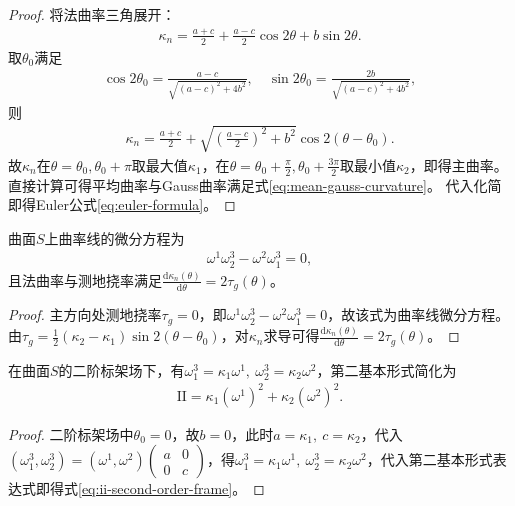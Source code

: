 \documentclass[../../main.tex]{subfiles}%
\begin{document}
\begin{proof}

将法曲率三角展开：
\begin{align*}
\kappa_n=\frac{a+c}{2}+\frac{a-c}{2}\cos2\theta+b\sin2\theta.
\end{align*}
取$\theta_0$满足
\begin{align*}
\cos2\theta_0=\frac{a-c}{\sqrt{(a-c)^2+4b^2}},\quad \sin2\theta_0=\frac{2b}{\sqrt{(a-c)^2+4b^2}},
\end{align*}
则
\begin{align*}
\kappa_n=\frac{a+c}{2}+\sqrt{\left(\frac{a-c}{2}\right)^2+b^2}\cos2(\theta-\theta_0).
\end{align*}
故$\kappa_n$在$\theta=\theta_0,\theta_0+\pi$取最大值$\kappa_1$，在$\theta=\theta_0+\frac{\pi}{2},\theta_0+\frac{3\pi}{2}$取最小值$\kappa_2$，即得主曲率。
直接计算可得平均曲率与Gauss曲率满足式\eqref{eq:mean-gauss-curvature}。
代入化简即得Euler公式\eqref{eq:euler-formula}。

\end{proof}

\begin{proposition}
曲面$S$上曲率线的微分方程为
\begin{align}
\omega^1\omega_2^3-\omega^2\omega_1^3=0,\label{eq:curvature-line-eq}
\end{align}
且法曲率与测地挠率满足$\frac{\mathrm{d}\kappa_n(\theta)}{\mathrm{d}\theta}=2\tau_g(\theta)$。
\end{proposition}

\begin{proof}

主方向处测地挠率$\tau_g=0$，即$\omega^1\omega_2^3-\omega^2\omega_1^3=0$，故该式为曲率线微分方程。
由$\tau_g=\frac{1}{2}(\kappa_2-\kappa_1)\sin2(\theta-\theta_0)$，对$\kappa_n$求导可得$\frac{\mathrm{d}\kappa_n(\theta)}{\mathrm{d}\theta}=2\tau_g(\theta)$。

\end{proof}

\begin{proposition}
在曲面$S$的二阶标架场下，有$\omega_1^3=\kappa_1\omega^1,\ \omega_2^3=\kappa_2\omega^2$，第二基本形式简化为
\begin{align}
\mathrm{II}=\kappa_1(\omega^1)^2+\kappa_2(\omega^2)^2.\label{eq:ii-second-order-frame}
\end{align}
\end{proposition}

\begin{proof}

二阶标架场中$\theta_0=0$，故$b=0$，此时$a=\kappa_1,\ c=\kappa_2$，代入$(\omega_1^3,\omega_2^3)=(\omega^1,\omega^2)\begin{pmatrix}a&0\\0&c\end{pmatrix}$，得$\omega_1^3=\kappa_1\omega^1,\ \omega_2^3=\kappa_2\omega^2$，代入第二基本形式表达式即得式\eqref{eq:ii-second-order-frame}。

\end{proof}
\end{document}
